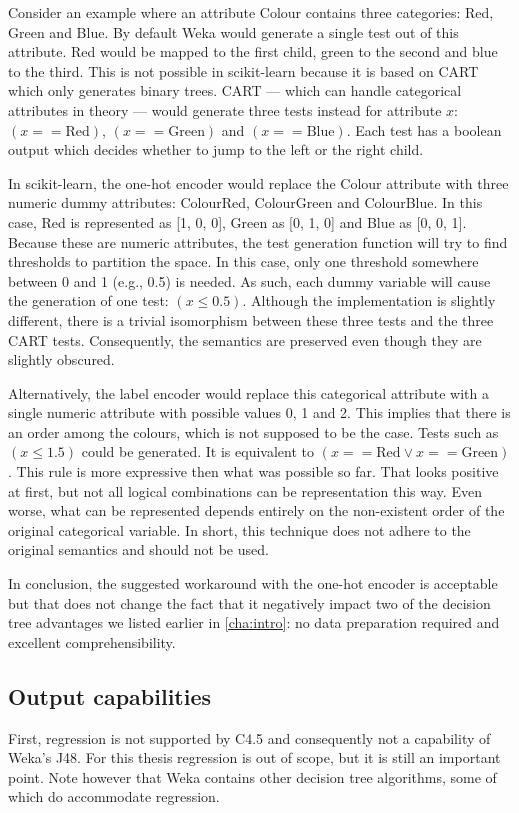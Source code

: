 Consider an example where an attribute Colour contains three categories: Red, Green and Blue. By default Weka would generate a single test out of this attribute. Red would be mapped to the first child, green to the second and blue to the third. This is not possible in scikit-learn because it is based on CART which only generates binary trees. CART --- which can handle categorical attributes in theory --- would generate three tests instead for attribute $x$: $(x == \text{Red})$, $(x == \text{Green})$ and $(x == \text{Blue})$. Each test has a boolean output which decides whether to jump to the left or the right child. 

In scikit-learn, the one-hot encoder would replace the Colour attribute with three numeric dummy attributes: ColourRed, ColourGreen and ColourBlue. In this case, Red is represented as [1, 0, 0], Green as [0, 1, 0] and Blue as [0, 0, 1]. Because these are numeric attributes, the test generation function will try to find thresholds to partition the space. In this case, only one threshold somewhere between 0 and 1 (e.g., 0.5) is needed. As such, each dummy variable will cause the generation of one test: $(x \leqslant 0.5)$. Although the implementation is slightly different, there is a trivial isomorphism between these three tests and the three CART tests. Consequently, the semantics are preserved even though they are slightly obscured.

Alternatively, the label encoder would replace this categorical attribute with a single numeric attribute with possible values 0, 1 and 2. This implies that there is an order among the colours, which is not supposed to be the case. Tests such as $(x \leqslant 1.5)$ could be generated. It is equivalent to $(x == \text{Red} \lor x == \text{Green})$. This rule is more expressive then what was possible so far. That looks positive at first, but not all logical combinations can be representation this way. Even worse, what can be represented depends entirely on the non-existent order of the original categorical variable. In short, this technique does not adhere to the original semantics and should not be used.

In conclusion, the suggested workaround with the one-hot encoder is acceptable but that does not change the fact that it negatively impact two of the decision tree advantages we listed earlier in \autoref{cha:intro}: no data preparation required and excellent comprehensibility.


\subsection{Output capabilities}
First, regression is not supported by C4.5 and consequently not a capability of Weka's J48. For this thesis regression is out of scope, but it is still an important point. Note however that Weka contains other decision tree algorithms, some of which do accommodate regression.

